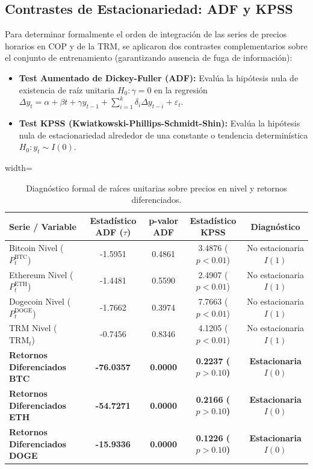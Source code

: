 \documentclass[12pt,letterpaper]{article}
\begin{document}
\subsection{Contrastes de Estacionariedad: ADF y KPSS}
Para determinar formalmente el orden de integración de las series de precios horarios en COP y de la TRM, se aplicaron dos contrastes complementarios sobre el conjunto de entrenamiento (garantizando ausencia de fuga de información):
\begin{itemize}
    \item \textbf{Test Aumentado de Dickey-Fuller (ADF):} Evalúa la hipótesis nula de existencia de raíz unitaria $H_0: \gamma = 0$ en la regresión $\Delta y_t = \alpha + \beta t + \gamma y_{t-1} + \sum_{i=1}^k \delta_i \Delta y_{t-i} + \varepsilon_t$.
    \item \textbf{Test KPSS (Kwiatkowski-Phillips-Schmidt-Shin):} Evalúa la hipótesis nula de estacionariedad alrededor de una constante o tendencia determinística $H_0: y_t \sim I(0)$.
\end{itemize}

\begin{table}[H]
\centering
\caption{Diagnóstico formal de raíces unitarias sobre precios en nivel y retornos diferenciados.}
\label{tab:stationarity}
\begin{adjustbox}{width=\textwidth}
\begin{tabular}{lcccc}
\toprule
\textbf{Serie / Variable} & \textbf{Estadístico ADF ($\tau$)} & \textbf{p-valor ADF} & \textbf{Estadístico KPSS} & \textbf{Diagnóstico} \\
\midrule
Bitcoin Nivel ($P_t^{\text{BTC}}$) & -1.5951 & 0.4861 & 3.4876 ($p < 0.01$) & No estacionaria $I(1)$ \\
Ethereum Nivel ($P_t^{\text{ETH}}$) & -1.4481 & 0.5590 & 2.4907 ($p < 0.01$) & No estacionaria $I(1)$ \\
Dogecoin Nivel ($P_t^{\text{DOGE}}$) & -1.7662 & 0.3974 & 7.7663 ($p < 0.01$) & No estacionaria $I(1)$ \\
TRM Nivel ($\text{TRM}_t$) & -0.7456 & 0.8346 & 4.1205 ($p < 0.01$) & No estacionaria $I(1)$ \\
\midrule
\textbf{Retornos Diferenciados BTC} & \textbf{-76.0357} & \textbf{0.0000} & \textbf{0.2237 ($p > 0.10$)} & \textbf{Estacionaria $I(0)$} \\
\textbf{Retornos Diferenciados ETH} & \textbf{-54.7271} & \textbf{0.0000} & \textbf{0.2166 ($p > 0.10$)} & \textbf{Estacionaria $I(0)$} \\
\textbf{Retornos Diferenciados DOGE} & \textbf{-15.9336} & \textbf{0.0000} & \textbf{0.1226 ($p > 0.10$)} & \textbf{Estacionaria $I(0)$} \\
\bottomrule
\end{tabular}
\end{adjustbox}
\end{table}
\end{document}
